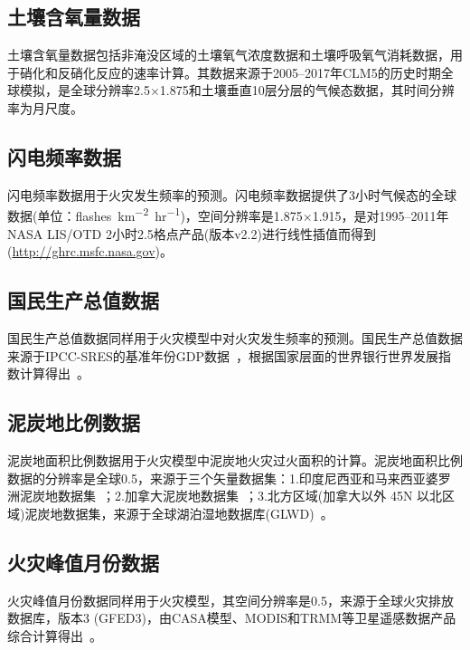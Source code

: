 \subsection{土壤含氧量数据}\label{土壤含氧量数据}
土壤含氧量数据包括非淹没区域的土壤氧气浓度数据和土壤呼吸氧气消耗数据，用于硝化和反硝化反应的速率计算。其数据来源于2005--2017年CLM5的历史时期全球模拟，是全球分辨率2.5\textdegree$\times$1.875\textdegree 和土壤垂直10层分层的气候态数据，其时间分辨率为月尺度。


\subsection{闪电频率数据}\label{闪电频率数据}
闪电频率数据用于火灾发生频率的预测。闪电频率数据提供了3小时气候态的全球数据(单位：\unit{flashes. km^{-2}.hr^{-1}})，空间分辨率是1.875\textdegree$\times$1.915\textdegree，是对1995--2011年NASA LIS/OTD 2小时2.5\textdegree{}格点产品(版本v2.2)进行线性插值而得到(\url{http://ghrc.msfc.nasa.gov})。 


\subsection{国民生产总值数据}\label{国民生产总值数据}
国民生产总值数据同样用于火灾模型中对火灾发生频率的预测。国民生产总值数据来源于IPCC-SRES的基准年份GDP数据~\citep{van2007downscaling}，根据国家层面的世界银行世界发展指数计算得出~\citep{WorldBank2004,UNSTAT2005}。


\subsection{泥炭地比例数据}\label{泥炭地比例数据}
泥炭地面积比例数据用于火灾模型中泥炭地火灾过火面积的计算。泥炭地面积比例数据的分辨率是全球0.5\textdegree，来源于三个矢量数据集：1.印度尼西亚和马来西亚婆罗洲泥炭地数据集~\citep{olson2001terrestrial}；2.加拿大泥炭地数据集~\citep{tarnocai2000peatlands}；3.北方区域(加拿大以外 45\textdegree N 以北区域)泥炭地数据集，来源于全球湖泊湿地数据库(GLWD)~\citep{lehner2004development}。


\subsection{火灾峰值月份数据}\label{火灾峰值月份数据}
火灾峰值月份数据同样用于火灾模型，其空间分辨率是0.5\textdegree，来源于全球火灾排放数据库，版本3 (GFED3)，由CASA模型、MODIS和TRMM等卫星遥感数据产品综合计算得出~\citep{van2010global}。


